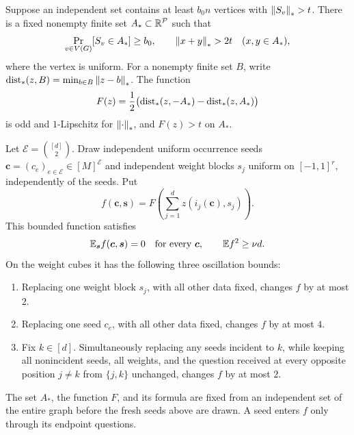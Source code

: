 \begin{lemma}
\label{ana:function}
Suppose an independent set contains at least \(b_0n\) vertices with
\(\left\|S_v\right\|_*>t\). There is a fixed nonempty finite set
\(A_*\subset\mathbb R^{\mathcal P}\) such that
\[
 \Pr_{v\in V(G)}[S_v\in A_*]\geq b_0,
 \qquad
 \left\|x+y\right\|_*>2t\quad(x,y\in A_*),
\]
where the vertex is uniform. For a nonempty finite set \(B\), write
\(\operatorname{dist}_*(z,B)=\min_{b\in B}\left\|z-b\right\|_*\). The function
\begin{equation}
 F(z)=\frac12\bigl(\operatorname{dist}_*(z,-A_*)-\operatorname{dist}_*(z,A_*)\bigr)
 \label{ana:distance-function}
\end{equation}
is odd and \(1\)-Lipschitz for \(\left\|\cdot\right\|_*\), and \(F(z)>t\)
on \(A_*\).

Let \(\mathcal E=\binom{[d]}2\). Draw independent uniform occurrence
seeds \(\boldsymbol c=(c_e)_{e\in\mathcal E}\in[M]^{\mathcal E}\)
and independent weight blocks \(s_j\) uniform on \([-1,1]^r\),
independently of the seeds. Put
\begin{equation}
 f(\boldsymbol c,\boldsymbol s)
    =F\left(\sum_{j=1}^d z(i_j(\boldsymbol c),s_j)\right).
 \label{ana:f}
\end{equation}
This bounded function satisfies
\begin{equation}
 \mathbb E_{\boldsymbol s}f(\boldsymbol c,\boldsymbol s)=0
       \quad\hbox{for every }\boldsymbol c,
 \qquad
 \mathbb E f^2\geq\nu d.
 \label{ana:variance}
\end{equation}
On the weight cubes it has the following three oscillation bounds:
\begin{enumerate}[label=\textup{(\roman*)}]
 \item Replacing one weight block \(s_j\), with all other data fixed,
       changes \(f\) by at most \(2\).
 \item Replacing one seed \(c_e\), with all other data fixed,
       changes \(f\) by at most \(4\).
 \item Fix \(k\in[d]\). Simultaneously replacing any seeds incident
       to \(k\), while keeping all nonincident seeds, all weights,
       and the question received at every opposite position
       \(j\ne k\) from \(\{j,k\}\) unchanged, changes \(f\)
       by at most \(2\).
\end{enumerate}
The set \(A_*\), the function \(F\), and its formula are fixed from
an independent set of the entire graph before the fresh seeds above
are drawn. A seed enters \(f\) only through its endpoint questions.
\end{lemma}

